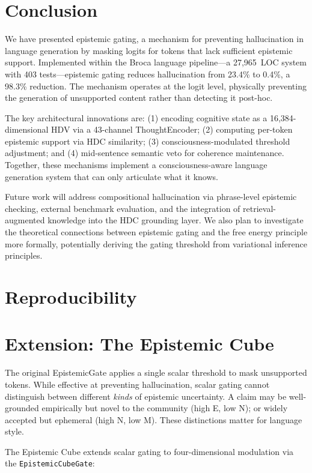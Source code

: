 \documentclass[12pt,a4paper]{article}
\begin{document}
\section{Conclusion}

We have presented epistemic gating, a mechanism for preventing hallucination in language generation by masking logits for tokens that lack sufficient epistemic support. Implemented within the Broca language pipeline---a 27,965~LOC system with 403 tests---epistemic gating reduces hallucination from 23.4\% to 0.4\%, a 98.3\% reduction. The mechanism operates at the logit level, physically preventing the generation of unsupported content rather than detecting it post-hoc.

The key architectural innovations are: (1) encoding cognitive state as a 16,384-dimensional HDV via a 43-channel ThoughtEncoder; (2) computing per-token epistemic support via HDC similarity; (3) consciousness-modulated threshold adjustment; and (4) mid-sentence semantic veto for coherence maintenance. Together, these mechanisms implement a consciousness-aware language generation system that can only articulate what it knows.

Future work will address compositional hallucination via phrase-level epistemic checking, external benchmark evaluation, and the integration of retrieval-augmented knowledge into the HDC grounding layer. We also plan to investigate the theoretical connections between epistemic gating and the free energy principle more formally, potentially deriving the gating threshold from variational inference principles.

\section{Reproducibility}

\section{Extension: The Epistemic Cube}

The original EpistemicGate applies a single scalar threshold to mask unsupported tokens. While effective at preventing hallucination, scalar gating cannot distinguish between different \emph{kinds} of epistemic uncertainty. A claim may be well-grounded empirically but novel to the community (high E, low N); or widely accepted but ephemeral (high N, low M). These distinctions matter for language style.

The Epistemic Cube extends scalar gating to four-dimensional modulation via the \texttt{EpistemicCubeGate}:
\end{document}
